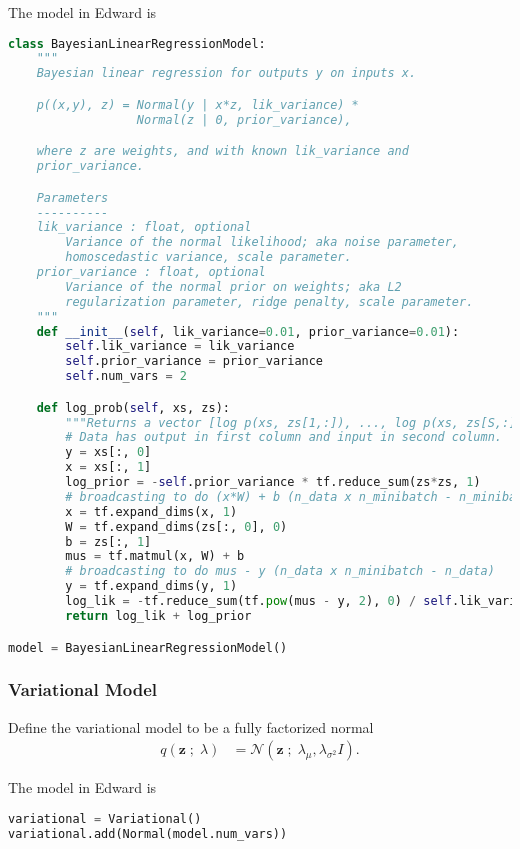 The model in Edward is 
\begin{lstlisting}[language=Python]
class BayesianLinearRegressionModel:
    """
    Bayesian linear regression for outputs y on inputs x.

    p((x,y), z) = Normal(y | x*z, lik_variance) *
                  Normal(z | 0, prior_variance),

    where z are weights, and with known lik_variance and
    prior_variance.

    Parameters
    ----------
    lik_variance : float, optional
        Variance of the normal likelihood; aka noise parameter,
        homoscedastic variance, scale parameter.
    prior_variance : float, optional
        Variance of the normal prior on weights; aka L2
        regularization parameter, ridge penalty, scale parameter.
    """
    def __init__(self, lik_variance=0.01, prior_variance=0.01):
        self.lik_variance = lik_variance
        self.prior_variance = prior_variance
        self.num_vars = 2

    def log_prob(self, xs, zs):
        """Returns a vector [log p(xs, zs[1,:]), ..., log p(xs, zs[S,:])]."""
        # Data has output in first column and input in second column.
        y = xs[:, 0]
        x = xs[:, 1]
        log_prior = -self.prior_variance * tf.reduce_sum(zs*zs, 1)
        # broadcasting to do (x*W) + b (n_data x n_minibatch - n_minibatch)
        x = tf.expand_dims(x, 1)
        W = tf.expand_dims(zs[:, 0], 0)
        b = zs[:, 1]
        mus = tf.matmul(x, W) + b
        # broadcasting to do mus - y (n_data x n_minibatch - n_data)
        y = tf.expand_dims(y, 1)
        log_lik = -tf.reduce_sum(tf.pow(mus - y, 2), 0) / self.lik_variance
        return log_lik + log_prior

model = BayesianLinearRegressionModel()
\end{lstlisting}


\subsubsection{Variational Model}
Define the variational model to be a fully factorized normal
\begin{align*}
  q(\mathbf{z} \;;\; \lambda)
  &=
  \mathcal{N}(\mathbf{z} \;;\; \lambda_\mu, \lambda_{\sigma^2} I).
\end{align*} 

The model in Edward is
\begin{lstlisting}[language=Python]
variational = Variational()
variational.add(Normal(model.num_vars))
\end{lstlisting}


